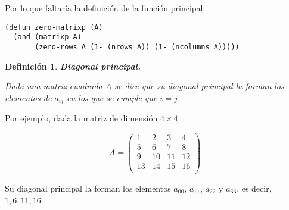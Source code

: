 \documentclass[a4paper,10pt]{article}
\newtheorem{defi}{{Definición}}
\begin{document}
\par \vspace{10pt}		

Por lo que faltaría la definición de la función principal:

\par \vspace{10pt}		

\begin{lstlisting}[language=clips]
(defun zero-matrixp (A)
  (and (matrixp A)
       (zero-rows A (1- (nrows A)) (1- (ncolumns A)))))
\end{lstlisting}

\par \vspace{12pt}

\begin{defi} \textbf{Diagonal principal.}\vspace{8pt}\par
Dada una matriz cuadrada $A$ se dice que su diagonal principal la forman los elementos de $a_{ij}$ en los que se cumple que $i=j$.
\end{defi}

\par \vspace{10pt}

Por ejemplo, dada la matriz de dimensión $4 \times 4$: 

$$
A=
\begin{pmatrix}
1 & 2 & 3 & 4 \\
5 & 6 & 7 & 8 \\
9 & 10 & 11 & 12 \\ 
13 & 14 & 15 & 16 \\ 
\end{pmatrix}
$$ 

\par \vspace{10pt}

Su diagonal principal la forman los elementos $a_{00}$, $a_{11}$, $a_{22}$ y $a_{33}$, es decir, ${1, 6, 11, 16}$.

\par \vspace{12pt}
\end{document}
